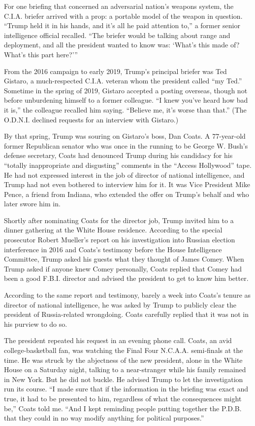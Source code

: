 For one briefing that concerned an adversarial nation's weapons system,
the C.I.A. briefer arrived with a prop: a portable model of the weapon
in question. ``Trump held it in his hands, and it's all he paid
attention to,'' a former senior intelligence official recalled. ``The
briefer would be talking about range and deployment, and all the
president wanted to know was: `What's this made of? What's this part
here?'''

From the 2016 campaign to early 2019, Trump's principal briefer was Ted
Gistaro, a much-respected C.I.A. veteran whom the president called ``my
Ted.'' Sometime in the spring of 2019, Gistaro accepted a posting
overseas, though not before unburdening himself to a former colleague.
``I knew you've heard how bad it is,'' the colleague recalled him
saying. ``Believe me, it's worse than that.'' (The O.D.N.I. declined
requests for an interview with Gistaro.)

By that spring, Trump was souring on Gistaro's boss, Dan Coats. A
77-year-old former Republican senator who was once in the running to be
George W. Bush's defense secretary, Coats had denounced Trump during his
candidacy for his ``totally inappropriate and disgusting'' comments in
the ``Access Hollywood'' tape. He had not expressed interest in the job
of director of national intelligence, and Trump had not even bothered to
interview him for it. It was Vice President Mike Pence, a friend from
Indiana, who extended the offer on Trump's behalf and who later swore
him in.

Shortly after nominating Coats for the director job, Trump invited him
to a dinner gathering at the White House residence. According to the
special prosecutor Robert Mueller's report on his investigation into
Russian election interference in 2016 and Coats's testimony before the
House Intelligence Committee, Trump asked his guests what they thought
of James Comey. When Trump asked if anyone knew Comey personally, Coats
replied that Comey had been a good F.B.I. director and advised the
president to get to know him better.

According to the same report and testimony, barely a week into Coats's
tenure as director of national intelligence, he was asked by Trump to
publicly clear the president of Russia-related wrongdoing. Coats
carefully replied that it was not in his purview to do so.

The president repeated his request in an evening phone call. Coats, an
avid college-basketball fan, was watching the Final Four N.C.A.A.
semi-finals at the time. He was struck by the abjectness of the new
president, alone in the White House on a Saturday night, talking to a
near-stranger while his family remained in New York. But he did not
buckle. He advised Trump to let the investigation run its course. ``I
made sure that if the information in the briefing was exact and true, it
had to be presented to him, regardless of what the consequences might
be,'' Coats told me. ``And I kept reminding people putting together the
P.D.B. that they could in no way modify anything for political
purposes.''

